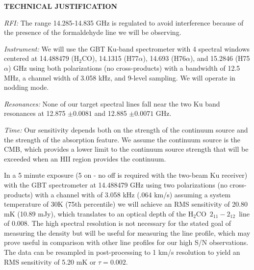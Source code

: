 \documentclass[11pt, preprint]{aastex}
\newcommand{\formaldehyde}{H\ensuremath{_2}CO}
\newcommand{\twotwo}{\ensuremath{2_{11}-2_{12}}}
\begin{document}


{\bf TECHNICAL JUSTIFICATION}

{\it RFI:} The range 14.285-14.835 GHz  is regulated to avoid interference because of
the presence of the formaldehyde line we will be observing.

{\it Instrument:} We will use the GBT Ku-band spectrometer with 4 spectral windows
centered at 14.488479 (\formaldehyde), 14.1315 (H77$\alpha$), 14.693
(H76$\alpha$), and 15.2846 (H75$\alpha$) GHz using both polarizations (no
cross-products) with a bandwidth of 12.5 MHz, a channel width of 3.058 kHz, and
9-level sampling.  We will operate in nodding mode.

{\it Resonances:}  None of our target spectral lines fall near the two Ku band 
resonances at 12.875 $\pm0.0081$ and 12.885 $\pm0.0071$ GHz.

{\it Time:} Our sensitivity depends both on the strength of the continuum source and
the strength of the absorption feature.  We assume the continuum source is the
CMB, which provides a lower limit to the continuum source strength that will be
exceeded when an HII region provides the continuum.

In a 5 minute exposure (5 on - no off is required with the two-beam Ku
receiver) with the GBT spectrometer at 14.488479 GHz using two polarizations
(no cross-products) with a channel with of 3.058 kHz (.064 km/s) assuming a
system temperature of 30K (75th percentile) we will achieve an RMS sensitivity
of 20.80 mK (10.89 mJy), which translates to an optical depth of the
\formaldehyde\ \twotwo\ line of 0.008.  The high spectral resolution is not
necessary for the stated goal of measuring the density but will be useful for
measuring the line profile, which may prove useful in comparison with other
line profiles for our high S/N observations.  The data can be resampled in
post-processing to 1 km/s  resolution to yield an RMS sensitivity of 5.20 mK or
$\tau=0.002$.  

\end{document}
